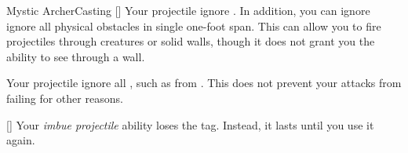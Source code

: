 \begin{feat}{Mystic Archer}{Casting}
        [] Your projectile  ignore .
        In addition, you can ignore ignore all physical obstacles in single one-foot span.
        This can allow you to fire projectiles through creatures or solid walls, though it does not grant you the ability to see through a wall.

         Your projectile  ignore all , such as from .
        This does not prevent your attacks from failing for other reasons.

        [] Your \textit{imbue projectile} ability loses the  tag.
        Instead, it lasts until you use it again.
    \end{feat}

